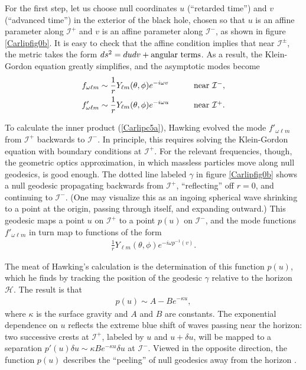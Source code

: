 \documentclass[11pt]{article}
\begin{document}
For the first step, let us choose null coordinates $u$ (``retarded time'')
and $v$ (``advanced time'') in the exterior of the black hole, chosen so
that $u$ is an affine parameter along $\mathcal{I}^+$ and $v$ is an
affine parameter along $\mathcal{I}^-$, as shown in figure \ref{Carlipfig0b}.
It is easy to check that the affine condition implies that near
$\mathcal{I}^\pm$, the metric takes the form $ds^2 = dudv + \hbox{angular
terms}$.  As a result, the Klein-Gordon equation greatly simplifies, and the
asymptotic modes become
\begin{alignat}{3}
&f_{\omega \ell m} \sim \frac{1}{r}Y_{\ell m}(\theta,\phi)e^{-i\omega v} 
  \qquad &&\hbox{near $\mathcal{I}^-$} ,\nonumber\\
&f'_{\omega \ell m} \sim \frac{1}{r}Y_{\ell m}(\theta,\phi)e^{-i\omega u} 
  \qquad &&\hbox{near $\mathcal{I}^+$}   .
\label{Carlipc7}
\end{alignat}

To calculate the inner product (\ref{Carlipc5a}), Hawking evolved 
the mode $f'_{\omega \ell m}$ from $\mathcal{I}^+$ backwards to 
$\mathcal{I}^-$.  In principle, this requires solving the Klein-Gordon equation 
with boundary conditions at $\mathcal{I}^+$.   For the relevant frequencies, 
though, the geometric optics approximation, in which massless particles move 
along null geodesics, is good enough.   The dotted line labeled $\gamma$
in figure \ref{Carlipfig0b} shows a null geodesic propagating backwards 
from $\mathcal{I}^+$, ``reflecting'' off $r=0$, and continuing to 
$\mathcal{I}^-$.  (One may visualize this as an ingoing spherical 
wave shrinking to a point at the origin, passing through itself, and expanding 
outward.)  This geodesic maps a point $u$ on $\mathcal{I}^+$ to a 
point $p(u)$ on $\mathcal{I}^-$, and the mode functions $f'_{\omega \ell m}$
in turn map to functions of the form
\begin{align}
\frac{1}{r}Y_{\ell m}(\theta,\phi)e^{-i\omega p^{-1}(v)}   .
\label{Carlipc8}
\end{align}

The meat of Hawking's calculation is the determination of this function
$p(u)$, which he finds by tracking the position of the geodesic
$\gamma$ relative to the horizon $\mathcal{H}$.   The result is that
\begin{align}
p(u) \sim A - Be^{-\kappa u}  ,
\label{Carlipc9}
\end{align}
where $\kappa$ is the surface gravity and $A$ and $B$ are constants.  The 
exponential dependence on $u$ reflects the extreme blue shift of waves
passing near the horizon: two successive crests at $\mathcal{I}^+$,
labeled by $u$ and $u+\delta u$, will be mapped to a separation 
$p'(u)\delta u \sim \kappa Be^{-\kappa u}\delta u$ at $\mathcal{I}^-$.
Viewed in the opposite direction, the function $p(u)$ describes the
``peeling'' of null geodesics away from the horizon \cite{BLSV}.
\end{document}
